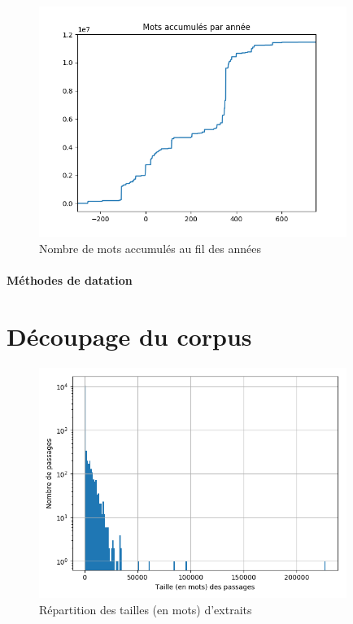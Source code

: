 \begin{figure}
    \centering
    \includegraphics[width=10cm]{results/analysis/corpus_analysis/accumulated_tokens.png}
    \caption{Nombre de mots accumulés au fil des années}
    \label{accumulated_tokens_per_year}
\end{figure}


\paragraph{Méthodes de datation}

\section{Découpage du corpus}
\label{subsec:corpus_decoupage}

\begin{figure}
    \centering
    \includegraphics[width=10cm]{results/analysis/corpus_analysis/passage_size_distribution.png}
    \caption{Répartition des tailles (en mots) d'extraits}
    \label{passage_size_distribution}
\end{figure}

